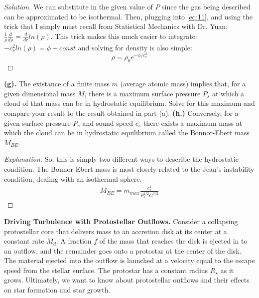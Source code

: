 \documentclass[10pt]{article}
\newenvironment{problem}[2][Problem]{\begin{trivlist}
\item[\hskip \labelsep {\bfseries #1}\hskip \labelsep {\bfseries #2.}]}{\end{trivlist}}
\begin{document}
\begin{proof}[Solution]
We can substitute in the given value of $P$ since the gas being described can be approximated to be isothermal. Then, plugging into \eqref{eq:11}, and using the trick that I simply must recall from Statistical Mechanics with Dr. Yuan: $\frac{1}{\rho}\frac{d}{d\rho} = \frac{d}{dr} ln(\rho)$. This trick makes this much easier to integrate: $-c_{s}^2 ln(\rho) = \phi + const$ and solving for density is also simple: 
\begin{equation}
\rho = \rho_{0}e^{-\phi / c_{s}^2}
\end{equation}
\end{proof}

\noindent\textbf{(g).}
The existance of a finite mass $m$ (average atomic mass) implies that, for a given dimensional mass $M$, there is a maximum surface pressure $P_{s}$ at which a cloud of that mass can be in hydrostatic equilibrium. Solve for this maximum and compare your result to the result obtained in part (a).
\noindent\textbf{(h.)}
Conversely, for a given surface pressure $P_{s}$ and sound speed $c_{s}$ there exists a maximum mass at which the cloud can be in hydrostatic equilibrium called the Bonnor-Ebert mass $M_{BE}$.
\begin{proof}[Explanation]
So, this is simply two different ways to describe the hydrostatic condition. The Bonnor-Ebert mass is most closely related to the Jean's instability condition, dealing with an isothermal sphere. 
\begin{align}
M_{BE} = m_{max}\frac{c_{s}^4}{P_{s}^{1/2}G^{3/2}}
\end{align}
\end{proof}

\begin{problem}{2.2}
\textbf{Driving Turbulence with Protostellar Outflows.}
Consider a collapsing protostellar core that delivers mass to an accretion disk at its center at a constant rate $\dot{M}_{d}$. A fraction $f$ of the mass that reaches the disk is ejected in to an outflow, and the remainder goes onto a protostar at the center of the disk. The material ejected into the outflow is launched at a velocity equal to the escape speed from the stellar surface. The protostar has a constant radius $R_{\star}$ as it grows. Ultimately, we want to know about protostellar outflows and their effects on star formation and star growth. 
\end{problem}
\end{document}
